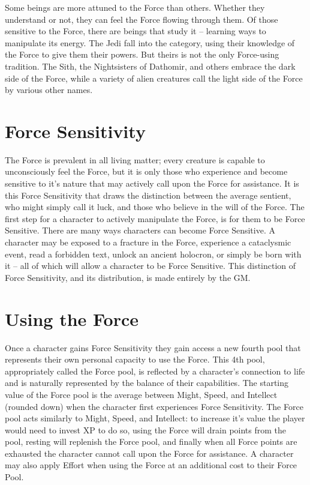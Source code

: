 \documentclass[a4paper,10pt,final,twocolumn,oneside]{book}
\begin{document}
Some beings are more attuned to the Force than others. Whether they understand or not, they can feel the Force flowing through them. Of those sensitive to the Force, there are beings that study it -- learning ways to manipulate its energy. The Jedi fall into the category, using their knowledge of the Force to give them their powers. But theirs is not the only Force-using tradition. The Sith, the Nightsisters of Dathomir, and others embrace the dark side of the Force, while a variety of alien creatures call the light side of the Force by various other names.

\section{Force Sensitivity} %
\label{sec:force_sensitivity}

The Force is prevalent in all living matter; every creature is capable to unconsciously feel the Force, but it is only those who experience and become sensitive to it's nature that may actively call upon the Force for assistance. It is this Force Sensitivity that draws the distinction between the average sentient, who might simply call it luck, and those who believe in the will of the Force. The first step for a character to actively manipulate the Force, is for them to be Force Sensitive. There are many ways characters can become Force Sensitive. A character may be exposed to a fracture in the Force, experience a cataclysmic event, read a forbidden text, unlock an ancient holocron, or simply be born with it -- all of which will allow a character to be Force Sensitive. This distinction of Force Sensitivity, and its distribution, is made entirely by the GM.


\section{Using the Force} %
\label{sec:using_the_force}

Once a character gains Force Sensitivity they gain access a new fourth pool that represents their own personal capacity to use the Force. This 4th pool, appropriately called the Force pool, is reflected by a character's connection to life and is naturally represented by the balance of their capabilities. The starting value of the Force pool is the average between Might, Speed, and Intellect (rounded down) when the character first experiences Force Sensitivity. The Force pool acts similarly to Might, Speed, and Intellect: to increase it's value the player would need to invest XP to do so, using the Force will drain points from the pool, resting will replenish the Force pool, and finally when all Force points are exhausted the character cannot call upon the Force for assistance. A character may also apply Effort when using the Force at an additional cost to their Force Pool.
\end{document}
